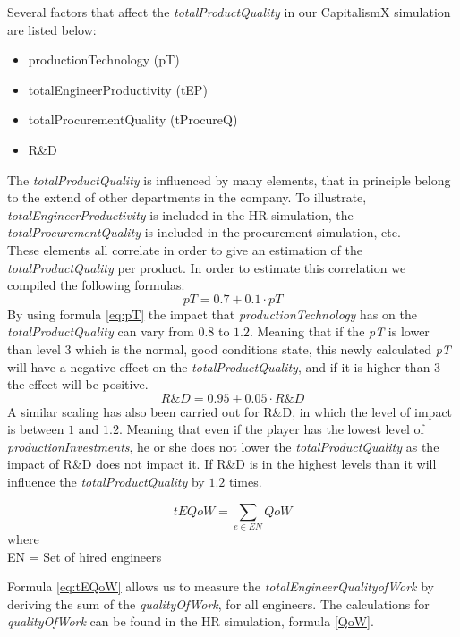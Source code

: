 Several factors that affect the \textit{totalProductQuality} in our CapitalismX simulation are listed below:
\begin{itemize}
\item productionTechnology (\gls{pT})
\item totalEngineerProductivity (\gls{tEP}) 
\item totalProcurementQuality (tProcureQ)
\item R\&D
\end{itemize}
The \textit{totalProductQuality} is influenced by many elements, that in principle belong to the extend of other departments in the company. To illustrate, \textit{totalEngineerProductivity} is included in the HR simulation, the \textit{totalProcurementQuality} is included in the procurement simulation, etc. \\
These elements all correlate in order to give an estimation of the \textit{totalProductQuality} per product. In order to estimate this correlation we compiled the following formulas.
 \begin{equation}
pT=0.7+0.1 \cdot pT
 \label{eq:pT}
 \end{equation}
By using formula \ref{eq:pT} the impact that \textit{productionTechnology} has on the \textit{totalProductQuality} can vary from $0.8$ to $1.2$. Meaning that if the \textit{pT} is lower than level $3$ which is the normal, good conditions state, this newly calculated \textit{pT} will have a negative effect on the \textit{totalProductQuality}, and if it is higher than $3$ the effect will be positive.
\begin{equation}
R\&D= 0.95 + 0.05 \cdot R\&D
\label{eq:R\&D}
\end{equation}
A similar scaling has also been carried out for R\&D, in which the level of impact is between $1$ and $1.2$. Meaning that even if the player has the lowest level of \textit{productionInvestments}, he or she does not lower the \textit{totalProductQuality} as the impact of R\&D does not impact it. If R\&D is in the highest levels than it will influence the \textit{totalProductQuality} by $1.2$ times.
\begin{center}

\begin{equation}
tEQoW=\sum_{e \in EN}{QoW}
\label{eq:tEQoW}
\end{equation}
where \\
\gls{EN} = Set of hired engineers
\end{center}
Formula \ref{eq:tEQoW} allows us to measure the \textit{totalEngineerQualityofWork} by deriving the sum of the \textit{qualityOfWork}, for all engineers. The calculations for \textit{qualityOfWork} can be found in the HR simulation, formula \ref{QoW}.
